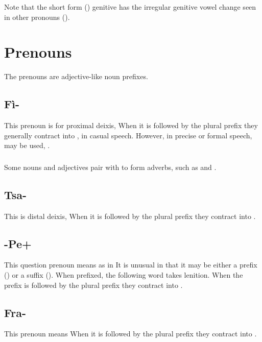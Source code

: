 \noindent Note that the short form () genitive has the
irregular genitive vowel change seen in other pronouns
().

\section{Prenouns}

\noindent The prenouns are adjective-like noun prefixes. 

\subsection{Fì-} This prenoun is for proximal deixis,   When
it is followed by the plural prefix  they generally contract
into ,  in casual speech.  However, in precise or
formal speech,  may be used, . \label{morph:prenoun:fi}
 

\subsubsection{} Some nouns and adjectives pair with  to form
adverbs, such as   and  .

\subsection{Tsa-} This is distal deixis,   When it is
followed by the plural prefix  they contract into 
. 
 

\subsection{-Pe+} \label{morph:pre:pe} This question prenoun means
 as in    It is unusual in
that it may be either a prefix () or a suffix ().
When prefixed, the following word takes lenition.  When the prefix is
followed by the plural prefix  they contract into .

\subsection{Fra-} This prenoun means   When
it is followed by the plural prefix  they contract into .
 

